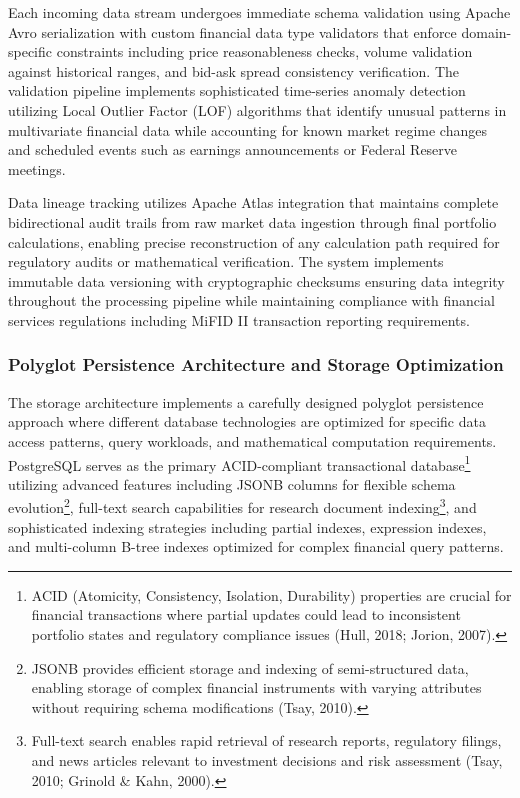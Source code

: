 \documentclass[12pt,a4paper]{article}
\theoremstyle{definition}
\theoremstyle{remark}
\begin{document}
Each incoming data stream undergoes immediate schema validation using Apache Avro serialization with custom financial data type validators that enforce domain-specific constraints including price reasonableness checks, volume validation against historical ranges, and bid-ask spread consistency verification. The validation pipeline implements sophisticated time-series anomaly detection utilizing Local Outlier Factor (LOF) algorithms that identify unusual patterns in multivariate financial data while accounting for known market regime changes and scheduled events such as earnings announcements or Federal Reserve meetings.

Data lineage tracking utilizes Apache Atlas integration that maintains complete bidirectional audit trails from raw market data ingestion through final portfolio calculations, enabling precise reconstruction of any calculation path required for regulatory audits or mathematical verification. The system implements immutable data versioning with cryptographic checksums ensuring data integrity throughout the processing pipeline while maintaining compliance with financial services regulations including MiFID II transaction reporting requirements.

\subsubsection{Polyglot Persistence Architecture and Storage Optimization}

The storage architecture implements a carefully designed polyglot persistence approach where different database technologies are optimized for specific data access patterns, query workloads, and mathematical computation requirements. PostgreSQL serves as the primary ACID-compliant transactional database\footnote{ACID (Atomicity, Consistency, Isolation, Durability) properties are crucial for financial transactions where partial updates could lead to inconsistent portfolio states and regulatory compliance issues (Hull, 2018; Jorion, 2007).} utilizing advanced features including JSONB columns for flexible schema evolution\footnote{JSONB provides efficient storage and indexing of semi-structured data, enabling storage of complex financial instruments with varying attributes without requiring schema modifications (Tsay, 2010).}, full-text search capabilities for research document indexing\footnote{Full-text search enables rapid retrieval of research reports, regulatory filings, and news articles relevant to investment decisions and risk assessment (Tsay, 2010; Grinold \& Kahn, 2000).}, and sophisticated indexing strategies including partial indexes, expression indexes, and multi-column B-tree indexes optimized for complex financial query patterns.
\end{document}
